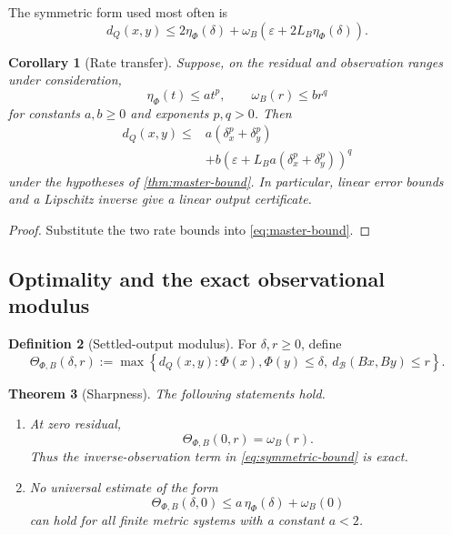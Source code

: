 \documentclass[11pt]{article}
\newtheorem{theorem}{Theorem}[section]
\newtheorem{corollary}[theorem]{Corollary}
\theoremstyle{definition}
\newtheorem{definition}[theorem]{Definition}
\theoremstyle{remark}
\numberwithin{equation}{section}
\newcommand{\cB}{\mathcal B}
\newcommand{\eps}{\varepsilon}
\begin{document}
The symmetric form used most often is
\begin{equation}\label{eq:symmetric-bound}
 d_Q(x,y)\le
 2\eta_\Phi(\delta)+
 \omega_B\!\left(\eps+2L_B\eta_\Phi(\delta)\right).
\end{equation}

\begin{corollary}[Rate transfer]\label{cor:rate-transfer}
Suppose, on the residual and observation ranges under consideration,
\[
 \eta_\Phi(t)\le a t^p,
 \qquad
 \omega_B(r)\le b r^q
\]
for constants $a,b\ge0$ and exponents $p,q>0$.  Then
\[
\begin{split}
 d_Q(x,y)\le{}&a(\delta_x^p+\delta_y^p)\\
 &+b\!\left(\eps+L_Ba(\delta_x^p+\delta_y^p)\right)^q
\end{split}
\]
under the hypotheses of \cref{thm:master-bound}.  In particular, linear
error bounds and a Lipschitz inverse give a linear output certificate.
\end{corollary}

\begin{proof}
Substitute the two rate bounds into \eqref{eq:master-bound}.
\end{proof}

\subsection{Optimality and the exact observational modulus}

\begin{definition}[Settled-output modulus]
For $\delta,r\ge0$, define
\[
 \Theta_{\Phi,B}(\delta,r):=
 \max\left\{
 d_Q(x,y):\Phi(x),\Phi(y)\le\delta,
 \ d_{\cB}(Bx,By)\le r
 \right\}.
\]
\end{definition}

\begin{theorem}[Sharpness]\label{thm:sharpness}
The following statements hold.
\begin{enumerate}[label=(\roman*)]
\item At zero residual,
\[
 \Theta_{\Phi,B}(0,r)=\omega_B(r).
\]
Thus the inverse-observation term in \eqref{eq:symmetric-bound} is exact.
\item No universal estimate of the form
\[
 \Theta_{\Phi,B}(\delta,0)\le a\,\eta_\Phi(\delta)+\omega_B(0)
\]
can hold for all finite metric systems with a constant $a<2$.
\end{enumerate}
\end{theorem}
\end{document}
